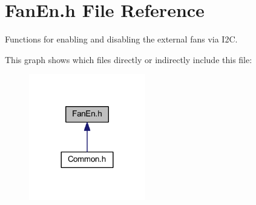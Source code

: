 \hypertarget{a00017}{\section{Fan\-En.\-h File Reference}
\label{a00017}
}


Functions for enabling and disabling the external fans via I2\-C.  


This graph shows which files directly or indirectly include this file\-:
\nopagebreak
\begin{figure}[H]
\begin{center}
\leavevmode
\includegraphics[width=144pt]{a00048}
\end{center}
\end{figure}
